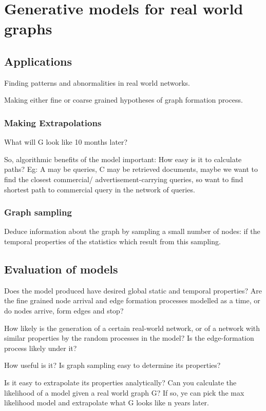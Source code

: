 \documentclass[oneside, article]{memoir}
\begin{document}
\chapter{Generative models for real world graphs}
\section{Applications}
Finding patterns and abnormalities in real world networks.

Making either fine or coarse grained hypotheses of graph formation process.

\subsection{Making Extrapolations}
What will G look like 10 months later?

So, algorithmic benefits of the model important: How easy is it to calculate paths? Eg: A may be queries, C may be retrieved documents, maybe we want to find the closest commercial/ advertisement-carrying queries, so want to find shortest path to commercial query in the network of queries.

\subsection{Graph sampling}
Deduce information about the graph by sampling a small number of nodes: if the temporal properties of the statistics which result from this sampling.

\section{Evaluation of models}
Does the model produced have desired global static and temporal properties? Are the fine grained node arrival and edge formation processes modelled as a time, or do nodes arrive, form edges and stop?

How likely is the generation of a certain real-world network, or of a network with similar properties by the random processes in the model? Is the edge-formation process likely under it?

How useful is it? Is graph sampling easy to determine its properties?

Is it easy to extrapolate its properties analytically? Can you calculate the likelihood of a model given a real world graph G? If so, ye can pick the max likelihood model and extrapolate what G looks like n years later.
\end{document}
